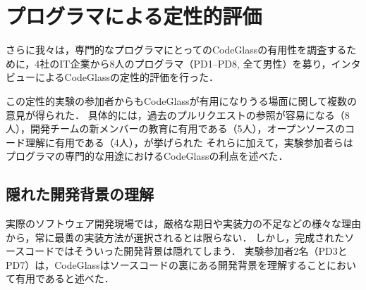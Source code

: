 \section{プログラマによる定性的評価}

さらに我々は，専門的なプログラマにとってのCodeGlassの有用性を調査するために，4社のIT企業から8人のプログラマ（PD1--PD8, 全て男性）を募り，インタビューによるCodeGlassの定性的評価を行った．

この定性的実験の参加者からもCodeGlassが有用になりうる場面に関して複数の意見が得られた．
具体的には，過去のプルリクエストの参照が容易になる（8人），開発チームの新メンバーの教育に有用である（5人），オープンソースのコード理解に有用である（4人），が挙げられた
それらに加えて，実験参加者らはプログラマの専門的な用途におけるCodeGlassの利点を述べた．





\subsection*{隠れた開発背景の理解}

実際のソフトウェア開発現場では，厳格な期日や実装力の不足などの様々な理由から，常に最善の実装方法が選択されるとは限らない．
しかし，完成されたソースコードではそういった開発背景は隠れてしまう．
実験参加者2名（PD3とPD7）は，CodeGlassはソースコードの裏にある開発背景を理解することにおいて有用であると述べた．


